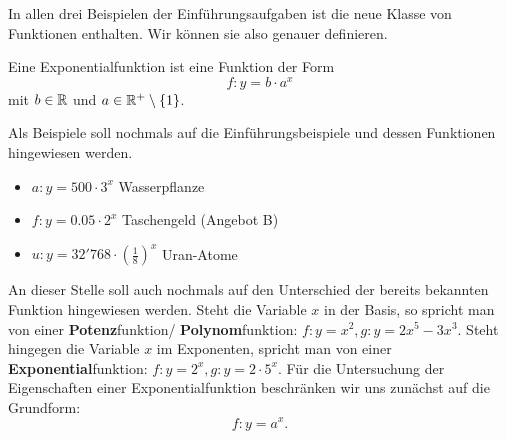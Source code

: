 \documentclass[11pt,oneside]{article}
\begin{document}
	In allen drei Beispielen der Einführungsaufgaben ist die neue Klasse von Funktionen enthalten. Wir können sie also genauer definieren.
	\begin{definition}
		Eine Exponentialfunktion ist eine Funktion der Form
		\[f:y=b\cdot a^x\]
		mit $b\in\mathbb{R}$ und $a\in\mathbb{R}^+\setminus\{1\}$.
	\end{definition}
	\begin{beispiel}
		Als Beispiele soll nochmals auf die Einführungsbeispiele und dessen Funktionen hingewiesen werden.
		\begin{itemize}
			\item $\displaystyle a:y=500\cdot 3^x$ \glqq Wasserpflanze\grqq
			\item $\displaystyle f:y=0.05\cdot 2^x$ \glqq Taschengeld (Angebot B)\grqq
			\item $\displaystyle u:y=32'768\cdot \left(\frac{1}{8}\right)^x$ \glqq Uran-Atome\grqq
		\end{itemize}
	\end{beispiel}
	An dieser Stelle soll auch nochmals auf den Unterschied der bereits bekannten Funktion hingewiesen werden.\newline
	Steht die Variable $x$ in der Basis, so spricht man von einer \textbf{Potenz}funktion/ \textbf{Polynom}funktion: $f:y=x^2, g:y=2x^5-3x^3$.\newline
	Steht hingegen die Variable $x$ im Exponenten, spricht man von einer \textbf{Exponential}funktion: $f:y=2^x, g:y=2\cdot 5^x$.
	\newpage
	Für die Untersuchung der Eigenschaften einer Exponentialfunktion beschränken wir uns zunächst auf die Grundform: \[f:y=a^x.\]
\end{document}
